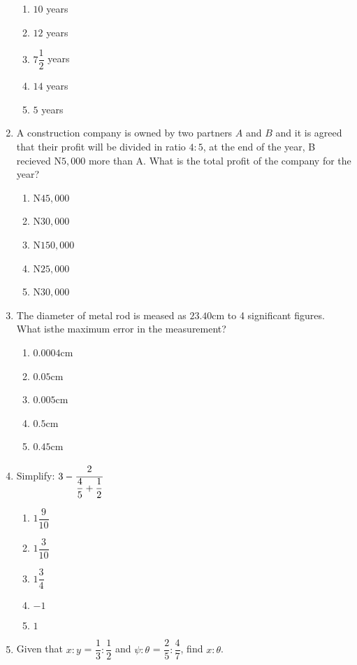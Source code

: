 \begin{multicols}{2}
\begin{enumerate}[label={\arabic*.}]
    \begin{enumerate}[label={\Alph*.}]
    \item \(10\) years
    \item \(12\) years
    \item \(7\dfrac{1}{2}\) years
    \item \(14\) years
    \item \(5\) years
    \end{enumerate}
\item A construction company is owned by two partners \(A\) and \(B\) and it is agreed that their profit will be divided in ratio \(4:5\), at the end of the year, B recieved N\(5,000\) more than A. What is the total profit of the company for the year? 
    \begin{enumerate}[label={\Alph*.}]
    \item N\(45,000\)
    \item N\(30,000\)
    \item N\(150,000\)
    \item N\(25,000\)
    \item N\(30,000\)
    \end{enumerate}
\item The diameter of metal rod is meased as \(23.40\)cm to 4 significant figures. What isthe maximum error in the measurement?
    \begin{enumerate}[label={\Alph*.}]
    \item \(0.0004\)cm
    \item \(0.05\)cm
    \item \(0.005\)cm
    \item \(0.5\)cm
    \item \(0.45\)cm
    \end{enumerate}
\item Simplify: \(3 - {\cfrac{2}{\dfrac{4}{5} + \dfrac{1}{2}}}\)
    \begin{enumerate}[label={\Alph*.}]
    \item \(1\dfrac{9}{10}\)
    \item \(1\dfrac{3}{10}\)
    \item \(1\dfrac{3}{4}\)
    \item \(-1\)
    \item \(1\)
    \end{enumerate}
\item Given that \(x:y\) = \(\dfrac{1}{3}:\dfrac{1}{2}\) and \(\psi:\theta\) = \(\dfrac{2}{5}:\dfrac{4}{7}\), find \(x:\theta\).
    \begin{enumerate}[label={\Alph*.}]

\end{enumerate}
\end{enumerate}
\end{multicols}
